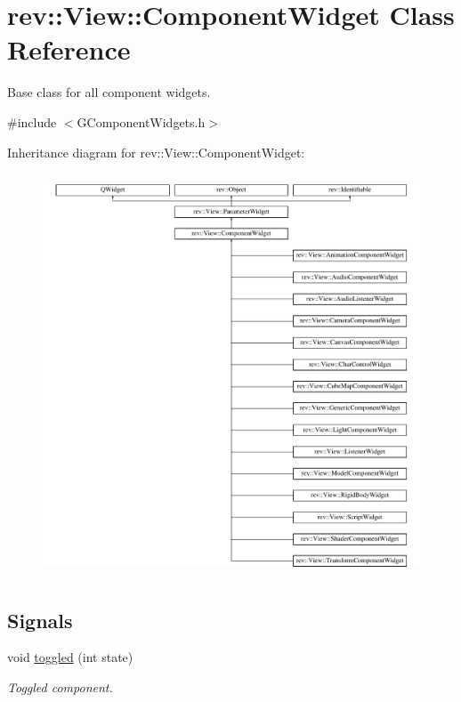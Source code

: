\hypertarget{classrev_1_1_view_1_1_component_widget}{}\section{rev\+::View\+::Component\+Widget Class Reference}
\label{classrev_1_1_view_1_1_component_widget}


Base class for all component widgets.  




{\ttfamily \#include $<$G\+Component\+Widgets.\+h$>$}

Inheritance diagram for rev\+::View\+::Component\+Widget\+:\begin{figure}[H]
\begin{center}
\leavevmode
\includegraphics[height=12.000000cm]{classrev_1_1_view_1_1_component_widget}
\end{center}
\end{figure}
\subsection*{Signals}
\begin{DoxyCompactItemize}
\item 
\mbox{\label{classrev_1_1_view_1_1_component_widget_a755d3f13873abc23fadfb0cf5ecd2e22}} 
void \mbox{\hyperlink{classrev_1_1_view_1_1_component_widget_a755d3f13873abc23fadfb0cf5ecd2e22}{toggled}} (int state)
\begin{DoxyCompactList}\small\item\em Toggled component. \end{DoxyCompactList}\end{DoxyCompactItemize}
